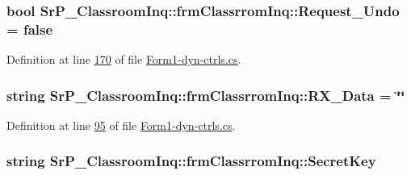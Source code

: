 \hypertarget{class_sr_p___classroom_inq_1_1frm_classrrom_inq_acb5bab8dcbcbfc8ed7a5b260ddba84e3}{
\subsubsection[{\-Request\-\_\-\-Undo}]{\setlength{\rightskip}{0pt plus 5cm}bool {\bf \-Sr\-P\-\_\-\-Classroom\-Inq\-::frm\-Classrrom\-Inq\-::\-Request\-\_\-\-Undo} = false}}
\label{class_sr_p___classroom_inq_1_1frm_classrrom_inq_acb5bab8dcbcbfc8ed7a5b260ddba84e3}


\-Definition at line \hyperlink{_form1-dyn-ctrls_8cs_source_l00170}{170} of file \hyperlink{_form1-dyn-ctrls_8cs_source}{\-Form1-\/dyn-\/ctrls.\-cs}.

\hypertarget{class_sr_p___classroom_inq_1_1frm_classrrom_inq_ab11c567168df8023b691c4adf4a149ad}{
\subsubsection[{\-R\-X\-\_\-\-Data}]{\setlength{\rightskip}{0pt plus 5cm}string {\bf \-Sr\-P\-\_\-\-Classroom\-Inq\-::frm\-Classrrom\-Inq\-::\-R\-X\-\_\-\-Data} = \char`\"{}\char`\"{}}}
\label{class_sr_p___classroom_inq_1_1frm_classrrom_inq_ab11c567168df8023b691c4adf4a149ad}


\-Definition at line \hyperlink{_form1-dyn-ctrls_8cs_source_l00095}{95} of file \hyperlink{_form1-dyn-ctrls_8cs_source}{\-Form1-\/dyn-\/ctrls.\-cs}.

\hypertarget{class_sr_p___classroom_inq_1_1frm_classrrom_inq_ae3ddacd233e71c710d89e12401af37c1}{
\subsubsection[{\-Secret\-Key}]{\setlength{\rightskip}{0pt plus 5cm}string {\bf \-Sr\-P\-\_\-\-Classroom\-Inq\-::frm\-Classrrom\-Inq\-::\-Secret\-Key}}}
\label{class_sr_p___classroom_inq_1_1frm_classrrom_inq_ae3ddacd233e71c710d89e12401af37c1}


